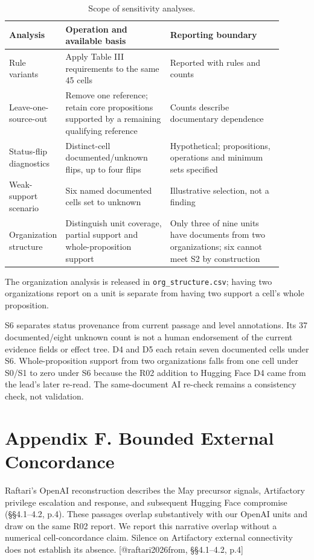 \documentclass[conference]{IEEEtran}
\begin{document}
\begin{table}[t]\centering\small
\setlength{\tabcolsep}{4pt}
\caption{Scope of sensitivity analyses.}
\begin{tabular}{>{\raggedright\arraybackslash}p{0.097\linewidth}>{\raggedright\arraybackslash}p{0.387\linewidth}>{\raggedright\arraybackslash}p{0.412\linewidth}}
\toprule
Analysis & Operation and available basis & Reporting boundary \\
\midrule
Rule variants & Apply Table III requirements to the same 45 cells & Reported with rules and counts \\
Leave-one-source-out & Remove one reference; retain core propositions supported by a remaining qualifying reference & Counts describe documentary dependence \\
Status-flip diagnostics & Distinct-cell documented/unknown flips, up to four flips & Hypothetical; propositions, operations and minimum sets specified \\
Weak-support scenario & Six named documented cells set to unknown & Illustrative selection, not a finding \\
Organization structure & Distinguish unit coverage, partial support and whole-proposition support & Only three of nine units have documents from two organizations; six cannot meet S2 by construction \\
\bottomrule
\end{tabular}
\end{table}

The organization analysis is released in \texttt{org\_structure.csv}; having two organizations report on a unit is separate from having two support a cell's whole proposition.

S6 separates status provenance from current passage and level annotations. Its 37 documented/eight unknown count is not a human endorsement of the current evidence fields or effect tree. D4 and D5 each retain seven documented cells under S6. Whole-proposition support from two organizations falls from one cell under S0/S1 to zero under S6 because the R02 addition to Hugging Face D4 came from the lead's later re-read. The same-document AI re-check remains a consistency check, not validation.

\section*{Appendix F. Bounded External Concordance}

Raftari's OpenAI reconstruction describes the May precursor signals, Artifactory privilege escalation and response, and subsequent Hugging Face compromise (§§4.1--4.2, p.4). These passages overlap substantively with our OpenAI units and draw on the same R02 report. We report this narrative overlap without a numerical cell-concordance claim. Silence on Artifactory external connectivity does not establish its absence. [@raftari2026from, §§4.1--4.2, p.4]
\end{document}
